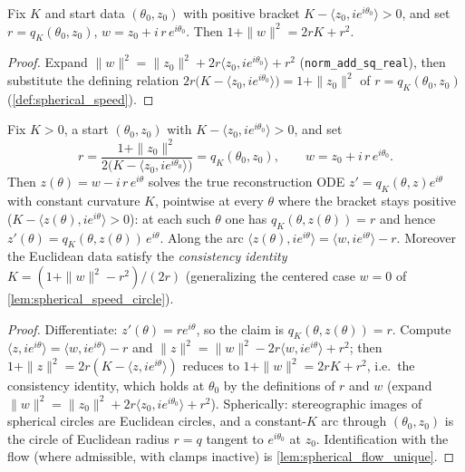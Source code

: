 \begin{lemma}
  \label{lem:constant_arc_consistency}
  Fix $K$ and start data $(\theta_0,z_0)$ with positive bracket
  $K-\langle z_0,ie^{i\theta_0}\rangle>0$, and set $r=q_K(\theta_0,z_0)$,
  $w=z_0+i\,r\,e^{i\theta_0}$. Then $1+\|w\|^2=2rK+r^2$.
\end{lemma}

\begin{proof}

\leanok
  Expand $\|w\|^2=\|z_0\|^2+2r\langle z_0,ie^{i\theta_0}\rangle+r^2$
  (\texttt{norm\_add\_sq\_real}), then substitute the defining relation
  $2r\bigl(K-\langle z_0,ie^{i\theta_0}\rangle\bigr)=1+\|z_0\|^2$ of
  $r=q_K(\theta_0,z_0)$ (\cref{def:spherical_speed}).
\end{proof}

\begin{lemma}

  \label{lem:constant_curvature_arc}
  Fix $K>0$, a start $(\theta_0,z_0)$ with $K-\langle z_0,ie^{i\theta_0}\rangle>0$, and set
  \[
    r=\frac{1+\|z_0\|^2}{2\bigl(K-\langle z_0,ie^{i\theta_0}\rangle\bigr)}=q_K(\theta_0,z_0),
    \qquad w=z_0+i\,r\,e^{i\theta_0}.
  \]
  Then $z(\theta)=w-i\,r\,e^{i\theta}$ solves the true reconstruction ODE
  $z'=q_K(\theta,z)e^{i\theta}$ with constant curvature $K$, pointwise at every $\theta$
  where the bracket stays positive ($K-\langle z(\theta),ie^{i\theta}\rangle>0$): at each
  such $\theta$ one has $q_K(\theta,z(\theta))=r$ and hence
  $z'(\theta)=q_K(\theta,z(\theta))\,e^{i\theta}$. Along the arc
  $\langle z(\theta),ie^{i\theta}\rangle=\langle w,ie^{i\theta}\rangle-r$. Moreover the
  Euclidean data satisfy the \emph{consistency identity} $K=(1+\|w\|^2-r^2)/(2r)$
  (generalizing the centered case $w=0$ of \cref{lem:spherical_speed_circle}).
\end{lemma}

\begin{proof}

\leanok
  Differentiate: $z'(\theta)=r e^{i\theta}$, so the claim is $q_K(\theta,z(\theta))=r$.
  Compute $\langle z,ie^{i\theta}\rangle=\langle w,ie^{i\theta}\rangle-r$ and
  $\|z\|^2=\|w\|^2-2r\langle w,ie^{i\theta}\rangle+r^2$; then
  $1+\|z\|^2=2r(K-\langle z,ie^{i\theta}\rangle)$ reduces to
  $1+\|w\|^2=2rK+r^2$, i.e.\ the consistency identity, which holds at $\theta_0$ by the
  definitions of $r$ and $w$ (expand $\|w\|^2=\|z_0\|^2+2r\langle z_0,ie^{i\theta_0}
  \rangle+r^2$). Spherically: stereographic images of spherical circles are Euclidean
  circles, and a constant-$K$ arc through $(\theta_0,z_0)$ is the circle of Euclidean
  radius $r=q$ tangent to $e^{i\theta_0}$ at $z_0$. Identification with the flow (where
  admissible, with clamps inactive) is \cref{lem:spherical_flow_unique}.
\end{proof}

